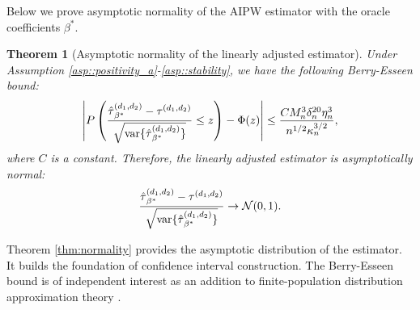 \documentclass{article}
\theoremstyle{plain}
\newtheorem{theorem}{Theorem}[section]
\newtheorem{lemma}[theorem]{Lemma}
\theoremstyle{definition}
\theoremstyle{remark}
\newcommand{\E}{\mathbb{E}}
\newcommand{\var}{\textup{var}}
\newcommand{\cN}{\mathcal{N}}
\newcommand{\sumi}{\sum_{i=1}^n}
\begin{document}
Below we prove asymptotic normality of the AIPW estimator with the oracle coefficients $\beta^*$. 
\begin{theorem}[Asymptotic normality of the linearly adjusted estimator]\label{thm:normality-app}
    Under Assumption \ref{asp::positivity_a}-\ref{asp::stability}, we have the following Berry-Esseen bound:
    \begin{align*}
        \left|P\left(\frac{\hat\tau{}^{(d_1, d_2)}_{\beta^*} - \tau^{(d_1, d_2)}}{\sqrt{\var\{\hat\tau{}^{(d_1, d_2)}_{\beta^*}\}}} \leq z\right) - \Phi(z)\right| \leq \frac{C M_n^3 \delta_n^{20} \eta_n^3}{n^{1/2} \kappa_n^{3/2} },
    \end{align*}
    where $C$ is a constant. Therefore, the linearly adjusted estimator is asymptotically normal:
    \begin{align*}
       \frac{\hat\tau{}^{(d_1, d_2)}_{\beta^*} - \tau^{(d_1, d_2)}}{\sqrt{\var\{\hat\tau{}^{(d_1, d_2)}_{\beta^*}\}}} \rightarrow \cN(0, 1).
    \end{align*}
\end{theorem}
Theorem \ref{thm:normality} provides the asymptotic distribution of the estimator. It builds the foundation of confidence interval construction. The Berry-Esseen bound is of independent interest as an addition to finite-population distribution approximation theory \citep{shi2025berry,Masoero2026multiple}.
\end{document}
